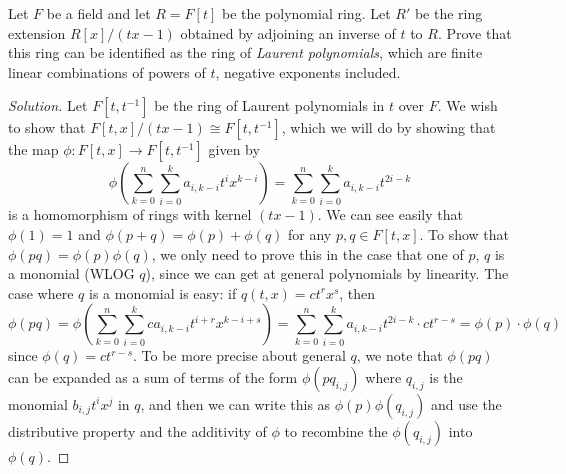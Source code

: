 \documentclass[10pt]{scrartcl}
\providecommand{\inv}{^{-1}}
\newenvironment{soln}{\begin{proof}[Solution]}{\end{proof}}
\begin{document}
\begin{problem*}[5.7]
	Let $F$ be a field and let $R = F[t]$ be the polynomial ring.
	Let $R'$ be the ring extension $R[x]/(tx-1)$ obtained by
	adjoining an inverse of $t$ to $R$. Prove that this ring can be identified
	as the ring of \emph{Laurent polynomials}, which are
	finite linear combinations of powers of $t$, negative exponents included.
\end{problem*}

\begin{soln}
	Let $F[t,t\inv]$ be the ring of Laurent polynomials in $t$ over $F$.
	We wish to show that $F[t,x]/(tx-1)\cong F[t,t\inv]$,
	which we will do by showing that the map
	$\phi\colon F[t,x]\to F[t,t\inv]$ given by
	\[\phi\left(\sum_{k=0}^n \sum_{i=0}^k a_{i,k-i}t^ix^{k-i}\right)
	= \sum_{k=0}^n \sum_{i=0}^k a_{i,k-i}t^{2i-k}\]
	is a homomorphism of rings with kernel $(tx-1)$.
	We can see easily that $\phi(1) = 1$ and $\phi(p+q) = \phi(p) + \phi(q)$
	for any $p,q\in F[t,x]$. To show that $\phi(pq) = \phi(p)\phi(q)$,
	we only need to prove this in the case that
	one of $p$, $q$ is a monomial (WLOG $q$),
	since we can get at general polynomials by linearity.
	The case where $q$ is a monomial is easy:
	if $q(t,x) = ct^rx^s$, then
	\[\phi(pq) = \phi\left(\sum_{k=0}^n \sum_{i=0}^k
	ca_{i,k-i}t^{i+r}x^{k-i+s}\right)
	= \sum_{k=0}^n \sum_{i=0}^k a_{i,k-i}t^{2i-k}\cdot ct^{r-s}
	= \phi(p)\cdot \phi(q)\]
	since $\phi(q) = ct^{r-s}$. To be more precise about general $q$,
	we note that $\phi(pq)$ can be expanded as a sum of terms
	of the form $\phi(pq_{i,j})$ where $q_{i,j}$ is the monomial
	$b_{i,j}t^ix^j$ in $q$, and then we can write this as
	$\phi(p)\phi(q_{i,j})$ and use the distributive property
	and the additivity of $\phi$ to recombine the $\phi(q_{i,j})$
	into $\phi(q)$.
	

\end{soln}
\end{document}

